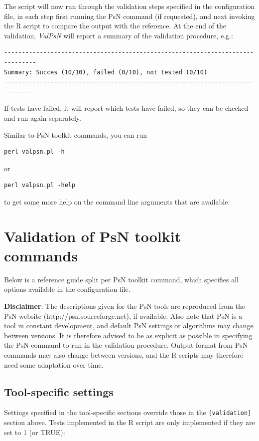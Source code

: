 \documentclass[a4,11pt]{report} \usepackage[pdftex]{graphicx}
\newcommand{\ValPsN}{\textcolor{PiranaOrange}{\textit{ValPsN}}\xspace}
\begin{document}
\noindent The script will now run through the validation steps specified in the
configuration file, in each step first running the PsN command (if
requested), and next invoking the R script to compare the output with
the reference. At the end of the validation, \ValPsN will report a
summary of the validation procedure, e.g.:

\begin{lstlisting}
-------------------------------------------------------------------------------
Summary: Succes (10/10), failed (0/10), not tested (0/10)
-------------------------------------------------------------------------------
\end{lstlisting}

\noindent If tests have failed, it will report which tests have
failed, so they can be checked and run again separately.

\noindent Similar to PsN toolkit commands, you can
run \begin{verbatim}perl valpsn.pl -h\end{verbatim}
or \begin{verbatim}perl valpsn.pl -help\end{verbatim} to get some more
help on the command line arguments that are available.

\newpage

\section{Validation of PsN toolkit commands}

Below is a reference guide split per PsN toolkit command, which specifies all
options available in the configuration file.

\vspace{10pt}

\noindent \textbf{Disclaimer}: The descriptions given for the PsN
tools are reproduced from the PsN website
(http://psn.sourceforge.net), if available. Also note that PsN is a
tool in constant development, and default PsN settings or algorithms may change
between versions. It is therefore advised to be as explicit as
possible in specifying the PsN command to run in the
validation procedure. Output format from PsN commands may also change between
versions, and the R scripts may therefore need some adaptation over
time.

\subsection{Tool-specific settings}
Settings specified in the tool-specific sections override those in the
{\tt [validation]} section above. Tests implemented in the R script
are only implemented if they are set to 1 (or TRUE):
\end{document}

